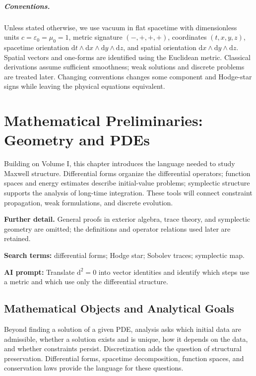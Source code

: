 \documentclass[11pt,openany]{book}
\numberwithin{equation}{chapter}
\theoremstyle{definition}
\theoremstyle{remark}
\newcommand{\dd}{\mathrm d}
\newcommand{\studyroute}[3]{%
  \par\smallskip\noindent\textbf{Further detail.} #1\par
  \begingroup\raggedright\noindent\textbf{Search terms:} #2.\par\endgroup
  \noindent\textbf{AI prompt:} #3\par
}
\begin{document}
\paragraph{Conventions.}
Unless stated otherwise, we use vacuum in flat spacetime with dimensionless units $c=\varepsilon_0=\mu_0=1$, metric signature $(-,+,+,+)$, coordinates $(t,x,y,z)$, spacetime orientation $\dd t\wedge\dd x\wedge\dd y\wedge\dd z$, and spatial orientation $\dd x\wedge\dd y\wedge\dd z$. Spatial vectors and one-forms are identified using the Euclidean metric. Classical derivations assume sufficient smoothness; weak solutions and discrete problems are treated later. Changing conventions changes some component and Hodge-star signs while leaving the physical equations equivalent.

\tableofcontents

\mainmatter
\setcounter{chapter}{-1}
\chapter{Mathematical Preliminaries: Geometry and PDEs}
\label{ch:prelim}
\begin{chaptersummary}
Building on Volume I, this chapter introduces the language needed to study Maxwell structure. Differential forms organize the differential operators; function spaces and energy estimates describe initial-value problems; symplectic structure supports the analysis of long-time integration. These tools will connect constraint propagation, weak formulations, and discrete evolution.
\end{chaptersummary}
\studyroute{General proofs in exterior algebra, trace theory, and symplectic geometry are omitted; the definitions and operator relations used later are retained.}{differential forms; Hodge star; Sobolev traces; symplectic map}{Translate $\dd^2=0$ into vector identities and identify which steps use a metric and which use only the differential structure.}
\section{Mathematical Objects and Analytical Goals}
Beyond finding a solution of a given PDE, analysis asks which initial data are admissible, whether a solution exists and is unique, how it depends on the data, and whether constraints persist. Discretization adds the question of structural preservation. Differential forms, spacetime decomposition, function spaces, and conservation laws provide the language for these questions.
\end{document}
